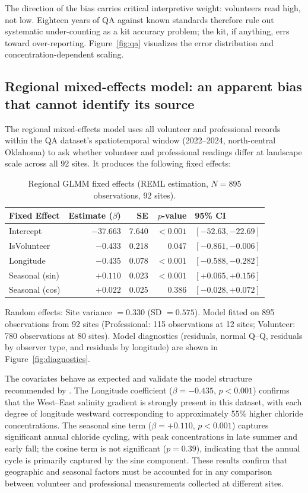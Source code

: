 \documentclass[lineno]{wlpeerj}
\begin{document}
The direction of the bias carries critical interpretive weight: volunteers read high, not low. Eighteen years of QA against known standards therefore rule out systematic under-counting as a kit accuracy problem; the kit, if anything, errs toward over-reporting. Figure~\ref{fig:qa} visualizes the error distribution and concentration-dependent scaling.

\subsection{Regional mixed-effects model: an apparent bias that cannot identify its source}
\label{sec:primaryresult}

The regional mixed-effects model uses all volunteer and professional records within the QA dataset's spatiotemporal window (2022--2024, north-central Oklahoma) to ask whether volunteer and professional readings differ at landscape scale across all 92 sites. It produces the following fixed effects:

\begin{table}[ht]
\centering
\caption{Regional GLMM fixed effects (REML estimation, $N=895$ observations, 92 sites).}
\label{tab:regionallme}
\begin{tabular}{l r r r l}
\toprule
Fixed Effect & Estimate ($\beta$) & SE & $p$-value & 95\% CI \\
\midrule
Intercept & $-37.663$ & 7.640 & $< 0.001$ & $[-52.63, -22.69]$ \\
IsVolunteer & $-0.433$ & 0.218 & 0.047 & $[-0.861, -0.006]$ \\
Longitude & $-0.435$ & 0.078 & $< 0.001$ & $[-0.588, -0.282]$ \\
Seasonal (sin) & $+0.110$ & 0.023 & $< 0.001$ & $[+0.065, +0.156]$ \\
Seasonal (cos) & $+0.022$ & 0.025 & 0.386 & $[-0.028, +0.072]$ \\
\bottomrule
\end{tabular}
\end{table}

Random effects: Site variance $= 0.330$ (SD $= 0.575$). Model fitted on 895 observations from 92 sites (Professional: 115 observations at 12 sites; Volunteer: 780 observations at 80 sites). Model diagnostics (residuals, normal Q--Q, residuals by observer type, and residuals by longitude) are shown in Figure~\ref{fig:diagnostics}.

The covariates behave as expected and validate the model structure recommended by \citet{Dyer2025}. The Longitude coefficient ($\beta = -0.435$, $p < 0.001$) confirms that the West--East salinity gradient is strongly present in this dataset, with each degree of longitude westward corresponding to approximately 55\% higher chloride concentrations. The seasonal sine term ($\beta = +0.110$, $p < 0.001$) captures significant annual chloride cycling, with peak concentrations in late summer and early fall; the cosine term is not significant ($p = 0.39$), indicating that the annual cycle is primarily captured by the sine component. These results confirm that geographic and seasonal factors must be accounted for in any comparison between volunteer and professional measurements collected at different sites.
\end{document}

